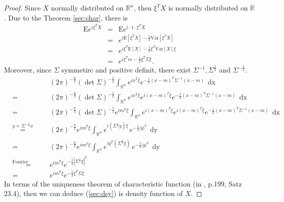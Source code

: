 \documentclass[a4paper, twoside, 11pt]{article}
\theoremstyle{definition}
\newcommand{\sqbr}[1]{\left[ {#1} \right]}
\begin{document}
\begin{proof}
  Since $X$ normally distributed on $\mathbb{R}^{n}$, then $\xi^T X$ is normally distributed on $\mathbb{R}$. Due to the Theorem \ref{sec:char}, there is
  \begin{eqnarray*}
	\mathrm{E} e^{i\xi^T X} &=& \mathrm{E} e^{i\cdot 1 \cdot \xi^T X}\\
	                        &=& e^{i\mathrm{E}\sqbr{\xi^T X} -\frac{1}{2}\mathrm{Var}\sqbr{\xi^T X}}\\
							&=& e^{i\xi^T\mathrm{E}\sqbr{X} - \frac{1}{2}\xi^T \mathrm{Var}\sqbr{X} \xi}\\
						    &=& e^{i\xi^Tm - \frac{1}{2}\xi^T \Sigma \xi}.
  \end{eqnarray*}
  Moreover, since $\Sigma$ symmetirc and positive definit, there exist $\Sigma^{-1}, \Sigma^{\frac{1}{2}}$ and $\Sigma^{-\frac{1}{2}}$.
  \begin{eqnarray*}
	&&(2\pi)^{-\frac{n}{2}} (\det\Sigma) ^{-\frac{1}{2}}\int_{\mathbb{R}^{n}} e^{i x^T \xi}e^{-\frac{1}{2}(x-m)^T\Sigma^{-1}(x-m)}\, \mathop{dx}\\
	&=& (2\pi)^{-\frac{n}{2}} (\det\Sigma) ^{-\frac{1}{2}}\int_{\mathbb{R}^{n}} e^{ix^T\xi} e^{i (x-m)^T \xi}e^{-\frac{1}{2}(x-m)^T\Sigma^{-1}(x-m)}\, \mathop{dx} \\
	&=& (2\pi)^{-\frac{n}{2}} (\det\Sigma) ^{-\frac{1}{2}}  e^{im^T\xi} \int_{\mathbb{R}^{n}} e^{i(x-m)^T\xi} e^{i (x-m)^T \xi}e^{-\frac{1}{2}(x-m)^T\Sigma^{-1}(x-m)}\, \mathop{dx} \\
	&\overset{y=\Sigma^{-\frac{1}{2}}x}{=}& (2\pi)^{-\frac{n}{2}} e^{im^T\xi} \int_{\mathbb{R}^{n}}e^{i (\Sigma^{\frac{1}{2}}y) \xi}\,e^{-\frac{1}{2}|y|^2}\, \mathop{dy}\\
	&=& (2\pi)^{-\frac{n}{2}} e^{im^T\xi}  \int_{\mathbb{R}^{n}}e^{i y^T (\Sigma^{\frac{1}{2}}\xi)}\,e^{-\frac{1}{2}|y|^2}\, \mathop{dy}\\
	&\overset{\text{Fourier transformation}}{=}& e^{im^T\xi}  e^{-\frac{1}{2}|\Sigma^{\frac{1}{2}}\xi|^2}\\
	&=& e^{im^T\xi}  e^{-\frac{1}{2}\xi^T\Sigma\xi}
  \end{eqnarray*}
  In terms of the uniqueness theorem of characteristic function (in \cite{bauer}, p.199, Satz 23.4), then we can deduce (\ref{sec:dsy}) is density function of $X$.
\end{proof}
\end{document}
